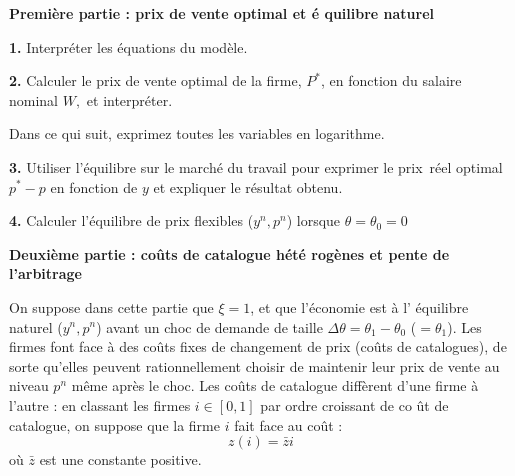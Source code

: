 \documentclass[11pt,a4paper]{article}
\begin{document}
\vspace{1cm}

\noindent \textbf{Premi\`{e}re partie : prix de vente optimal et \'{e}%
quilibre naturel}

\bigskip

\noindent \textbf{1.} Interpr\'{e}ter les \'{e}quations du mod\`{e}le.

\bigskip

\noindent \textbf{2.} Calculer le prix de vente optimal de la firme, 
$P^{\ast }$, en fonction du salaire nominal $W,$ et interpr\'{e}ter.



\bigskip
Dans ce qui suit, exprimez toutes les variables en logarithme.
\bigskip

\noindent \textbf{3.}  Utiliser l'\'{e}quilibre sur le march\'{e} du travail
pour exprimer le prix\ r\'{e}el optimal $p^{\ast }-p$ en fonction de $y$ et
expliquer le r\'{e}sultat obtenu.

\bigskip

\noindent \textbf{4.} Calculer l'\'{e}quilibre de prix flexibles ($%
y^{n},p^{n}$) lorsque $\theta=\theta_{0}=0$ 

\bigskip

\noindent \textbf{Deuxi\`{e}me partie : co\^{u}ts de catalogue h\'{e}t\'{e}%
rog\`{e}nes et pente de l'arbitrage}

\bigskip

On suppose dans cette partie que $\xi =1$, et que l'\'{e}conomie est \`{a} l'%
\'{e}quilibre naturel ($y^{n},p^{n}$) avant un choc de demande de taille $\Delta
\theta=\theta_{1}-\theta_{0}$ ($=\theta_{1}$). Les firmes font face \`{a} des co\^{u}ts fixes de changement de
prix (co\^{u}ts de catalogues), de sorte qu'elles peuvent rationnellement
choisir de maintenir leur prix de vente au niveau $p^{n}$ m\^{e}me apr\`{e}s
le choc. Les co\^{u}ts de catalogue diff\`{e}rent d'une firme \`{a} l'autre
: en classant les firmes $i\in \left[ 0,1\right] $ par ordre croissant de co%
\^{u}t de catalogue, on suppose que la firme $i$ fait face au co\^{u}t :%
\begin{equation*} 
z\left( i\right) =\bar{z}i
\end{equation*}%
o\`{u} $\bar{z}$ est une constante positive.
\end{document}
